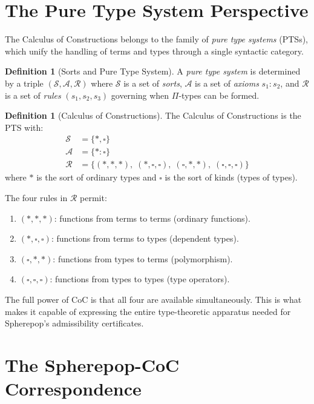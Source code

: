 \documentclass[12pt, a4paper, openany]{book}
\theoremstyle{plain}
\theoremstyle{definition}
\newtheorem{definition}[theorem]{Definition}
\theoremstyle{remark}
\begin{document}
\section{The Pure Type System Perspective}

The Calculus of Constructions belongs to the family of \emph{pure type systems}
(PTSs), which unify the handling of terms and types through a single syntactic
category.

\begin{definition}[Sorts and Pure Type System]
A \emph{pure type system} is determined by a triple $(\mathcal{S}, \mathcal{A},
\mathcal{R})$ where $\mathcal{S}$ is a set of \emph{sorts}, $\mathcal{A}$ is a
set of \emph{axioms} $s_1 : s_2$, and $\mathcal{R}$ is a set of \emph{rules}
$(s_1, s_2, s_3)$ governing when $\Pi$-types can be formed.
\end{definition}

\begin{definition}[Calculus of Constructions]
The Calculus of Constructions is the PTS with:
\begin{align*}
\mathcal{S} &= \{\ast, \square\} \\
\mathcal{A} &= \{\ast : \square\} \\
\mathcal{R} &= \{(\ast, \ast, \ast),\; (\ast, \square, \square),\;
                 (\square, \ast, \ast),\; (\square, \square, \square)\}
\end{align*}
where $\ast$ is the sort of ordinary types and $\square$ is the sort of kinds
(types of types).
\end{definition}

The four rules in $\mathcal{R}$ permit:
\begin{enumerate}
\item $(\ast, \ast, \ast)$: functions from terms to terms (ordinary functions).
\item $(\ast, \square, \square)$: functions from terms to types (dependent types).
\item $(\square, \ast, \ast)$: functions from types to terms (polymorphism).
\item $(\square, \square, \square)$: functions from types to types (type operators).
\end{enumerate}

The full power of CoC is that all four are available simultaneously. This is what
makes it capable of expressing the entire type-theoretic apparatus needed for
Spherepop's admissibility certificates.

\section{The Spherepop-CoC Correspondence}
\end{document}
